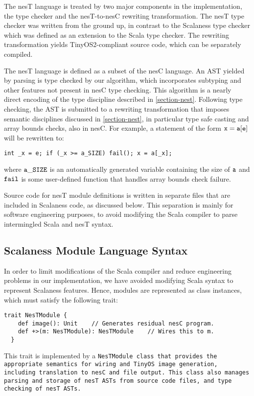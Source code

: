 The nesT language is treated by two major components in the implementation, the type checker and
the nesT-to-nesC rewriting transformation. The nesT type checker was written from the ground up,
in contrast to the Scalaness type checker which was defined as an extension to the Scala type
checker. The rewriting transformation yields TinyOS2-compliant source code, which can be
separately compiled.

The nesT language is defined as a subset of the nesC language. An AST yielded by parsing is type
checked by our algorithm, which incorporates subtyping and other features not present in nesC
type checking. This algorithm is a nearly direct encoding of the type discipline described in
\autoref{section-nest}. Following type checking, the AST is submitted to a rewriting
transformation that imposes semantic disciplines discussed in \autoref{section-nest}, in
particular type safe casting and array bounds checks, also in nesC. For example, a statement of
the form $\tt{x = a[e]}$ will be rewritten to:
\begin{Verbatim}[fontfamily=cmtt,fontsize=\scriptsize]
    int _x = e; if (_x >= a_SIZE) fail(); x = a[_x];  
\end{Verbatim}
where $\tt{a\_SIZE}$ is an automatically generated variable containing the size of $\tt{a}$ and
$\tt{fail}$ is some user-defined function that handles array bounds check
failure. %

Source code for nesT module definitions is written in separate files that are included in
Scalaness code, as discussed below. This separation is mainly for software engineering purposes,
to avoid modifying the Scala compiler to parse intermingled Scala and nesT syntax.

\subsection{Scalaness Module Language Syntax}

In order to limit modifications of the Scala compiler and reduce engineering problems in our
implementation, we have avoided modifying Scala syntax to represent Scalaness features. Hence,
modules are represented as class instances, which must satisfy the following trait:
\begin{Verbatim}[fontfamily=cmtt,fontsize=\scriptsize]
  trait NesTModule {
    def image(): Unit    // Generates residual nesC program.
    def +>(m: NesTModule): NesTModule    // Wires this to m.
  }
\end{Verbatim}
This trait is implemented by a \tt{NesTModule} class that provides the appropriate semantics for
wiring and TinyOS image generation, including translation to nesC and file output. This class
also manages parsing and storage of nesT ASTs from source code files, and type checking of nesT
ASTs.

